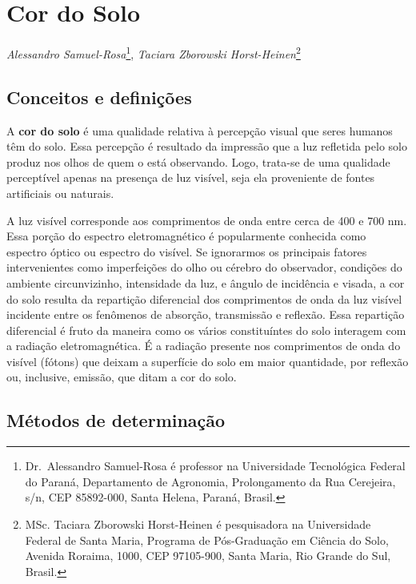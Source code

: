 \documentclass[
  a4paper,
  dvipsnames]{tufte-book}
\begin{document}
\hypertarget{cor-do-solo}{%
\chapter{Cor do Solo}\label{cor-do-solo}}

\emph{Alessandro Samuel-Rosa}\footnote{Dr.~Alessandro Samuel-Rosa é professor na Universidade Tecnológica Federal do Paraná, Departamento de Agronomia, Prolongamento da Rua Cerejeira, s/n, CEP 85892-000, Santa Helena, Paraná, Brasil.}, \emph{Taciara Zborowski Horst-Heinen}\footnote{MSc. Taciara Zborowski Horst-Heinen é pesquisadora na Universidade Federal de Santa Maria, Programa de Pós-Graduação em Ciência do Solo, Avenida Roraima, 1000, CEP 97105-900, Santa Maria, Rio Grande do Sul, Brasil.}

\hypertarget{conceitos-e-definiuxe7uxf5es}{%
\section{Conceitos e definições}\label{conceitos-e-definiuxe7uxf5es}}

A \textbf{cor do solo} é uma qualidade relativa à percepção visual que seres humanos têm do solo. Essa percepção é resultado da impressão que a luz refletida pelo solo produz nos olhos de quem o está observando. Logo, trata-se de uma qualidade perceptível apenas na presença de luz visível, seja ela proveniente de fontes artificiais ou naturais.

A luz visível corresponde aos comprimentos de onda entre cerca de 400 e 700 nm. Essa porção do espectro eletromagnético é popularmente conhecida como espectro óptico ou espectro do visível. Se ignorarmos os principais fatores intervenientes como imperfeições do olho ou cérebro do observador, condições do ambiente circunvizinho, intensidade da luz, e ângulo de incidência e visada, a cor do solo resulta da repartição diferencial dos comprimentos de onda da luz visível incidente entre os fenômenos de absorção, transmissão e reflexão. Essa repartição diferencial é fruto da maneira como os vários constituíntes do solo interagem com a radiação eletromagnética. É a radiação presente nos comprimentos de onda do visível (fótons) que deixam a superfície do solo em maior quantidade, por reflexão ou, inclusive, emissão, que ditam a cor do solo.

\hypertarget{muxe9todos-de-determinauxe7uxe3o}{%
\section{Métodos de determinação}\label{muxe9todos-de-determinauxe7uxe3o}}
\end{document}
